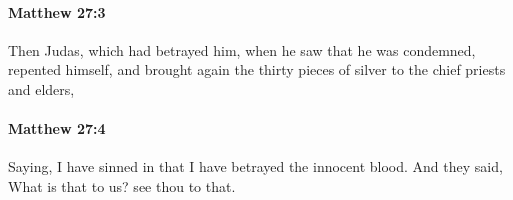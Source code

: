 		\paragraph{Matthew 27:3} %
			\label{MATTHEW-27-3}

			Then Judas, which had betrayed him, when he saw that he was condemned, repented himself, and brought again the thirty pieces of silver to the chief priests and elders,

			\begin{framed}
			\scriptsize
				\begin{compactdesc}
					\item[SBLG] 
				\end{compactdesc}
			\end{framed}

		\paragraph{Matthew 27:4} %
			\label{MATTHEW-27-4}

			Saying, I have sinned in that I have betrayed the innocent blood. And they said, What is that to us? see thou to that.


